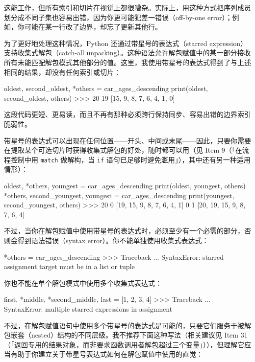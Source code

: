 这能工作，但所有索引和切片在视觉上都很嘈杂。实际上，用这种方式把序列成员划分成不同子集也容易出错，因为你更可能犯差一错误（off-by-one error）；例如，你可能在某一行改了边界，却忘了更新其他行。

为了更好地处理这种情况，Python 还通过带星号的表达式（starred expression）支持收集式解包（catch-all unpacking）。这种语法允许解包赋值中的某一部分接收所有未能匹配解包模式其他部分的值。这里，我使用带星号的表达式得到了与上述相同的结果，却没有任何索引或切片：

\begin{codebox}[python]
oldest, second_oldest, *others = car_ages_descending
print(oldest, second_oldest, others)
>>>
20 19 [15, 9, 8, 7, 6, 4, 1, 0]
\end{codebox}

这段代码更短、更易读，而且不再有那种必须跨行保持同步、容易出错的边界索引脆弱性。

带星号的表达式可以出现在任何位置——开头、中间或末尾——因此，只要你需要在提取某个可选切片时获得收集式解包的好处，随时都可以用（见 Item 9（「在流程控制中用 \texttt{match} 做解构，当 \texttt{if} 语句已足够时避免滥用」），其中还有另一种适用情形）：

\begin{codebox}[python]
oldest, *others, youngest = car_ages_descending
print(oldest, youngest, others)
*others, second_youngest, youngest = car_ages_descending
print(youngest, second_youngest, others)
>>>
20 0 [19, 15, 9, 8, 7, 6, 4, 1]
0 1 [20, 19, 15, 9, 8, 7, 6, 4]
\end{codebox}

不过，当你在解包赋值中使用带星号的表达式时，必须至少有一个必需的部分，否则会得到语法错误（syntax error）。你不能单独使用收集式表达式：

\begin{codebox}[python]
*others = car_ages_descending
>>>
Traceback ...
SyntaxError: starred assignment target must be in a list or
tuple
\end{codebox}

你也不能在单个解包模式中使用多个收集式表达式：

\begin{codebox}[python]
first, *middle, *second_middle, last = [1, 2, 3, 4]
>>>
Traceback ...
SyntaxError: multiple starred expressions in assignment
\end{codebox}

不过，在解包赋值语句中使用多个带星号的表达式是可能的，只要它们服务于被解包嵌套（nested）结构的不同层级。我不推荐下面这种写法（相关建议见 Item 31（「返回专用的结果对象，而非要求函数调用者解包超过三个变量」）），但理解它应当有助于你建立关于带星号表达式如何在解包赋值中使用的直觉：

